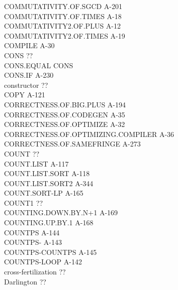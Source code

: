 \documentclass[10pt]{book}
\newenvironment{pubasis}{\begin{flushleft}}{\end{flushleft}}
\begin{document}
\begin{pubasis}
COMMUTATIVITY.OF.SGCD                        A-201\\
COMMUTATIVITY.OF.TIMES                       A-18\\
COMMUTATIVITY2.OF.PLUS                       A-12\\
COMMUTATIVITY2.OF.TIMES                      A-19\\
COMPILE                                      A-30\\
CONS                                         ??\\
CONS.EQUAL                                   CONS\\
CONS.IF                                      A-230\\
constructor                                  ??\\
COPY                                         A-121\\
CORRECTNESS.OF.BIG.PLUS                      A-194\\
CORRECTNESS.OF.CODEGEN                       A-35\\
CORRECTNESS.OF.OPTIMIZE                      A-32\\
CORRECTNESS.OF.OPTIMIZING.COMPILER           A-36\\
CORRECTNESS.OF.SAMEFRINGE                    A-273\\
COUNT                                        ??\\
COUNT.LIST                                   A-117\\
COUNT.LIST.SORT                              A-118\\
COUNT.LIST.SORT2                             A-344\\
COUNT.SORT-LP                                A-165\\
COUNT1                                       ??\\
COUNTING.DOWN.BY.N+1                         A-169\\
COUNTING.UP.BY.1                             A-168\\
COUNTPS                                      A-144\\
COUNTPS-                                     A-143\\
COUNTPS-COUNTPS                              A-145\\
COUNTPS-LOOP                                 A-142\\
cross-fertilization                          ??\\
Darlington                                   ??\\

\end{pubasis}
\end{document}
